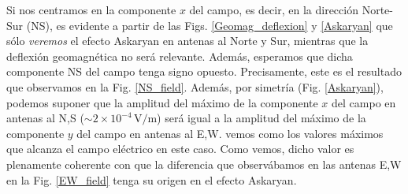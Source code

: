 \documentclass[12 pt, a4paper]{article} %
\numberwithin{equation}{section}
\numberwithin{figure}{section}
\begin{document}
Si nos centramos en la componente $x$ del campo, es decir, en la dirección Norte-Sur (NS), es evidente a partir de las Figs. \ref{Geomag_deflexion} y \eqref{Askaryan} que sólo \textit{veremos} el efecto Askaryan en antenas al Norte y Sur, mientras que la deflexión geomagnética no será relevante. Además, esperamos que dicha componente NS del campo tenga signo opuesto. Precisamente, este es el resultado que observamos en la Fig. \ref{NS_field}. Además, por simetría (Fig. \ref{Askaryan}), podemos suponer que la amplitud del máximo de la componente $x$ del campo en antenas al N,S ($\sim 2\times10^{-4}\,\mathrm{V/m}$) será igual a la amplitud del máximo de la componente $y$ del campo en antenas al E,W.  vemos como los valores máximos que alcanza el campo eléctrico en este caso. Como vemos, dicho valor es plenamente coherente con que la diferencia que observábamos en las antenas E,W en la Fig. \ref{EW_field} tenga su origen en el efecto Askaryan.
\end{document}
